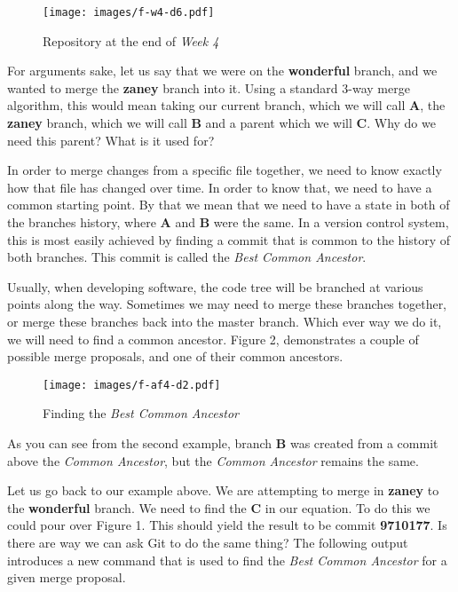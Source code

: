 \begin{figure}[hbt]
\centering
\texttt{[image: images/f-w4-d6.pdf]}
\caption{Repository at the end of \emph{Week 4}}
\end{figure}

For arguments sake, let us say that we were on the \textbf{wonderful} branch, and we wanted to merge the \textbf{zaney} branch into it.  Using a standard 3-way merge algorithm, this would mean taking our current branch, which we will call \textbf{A}, the \textbf{zaney} branch, which we will call \textbf{B} and a parent which we will \textbf{C}.  Why do we need this parent?  What is it used for?

In order to merge changes from a specific file together, we need to know exactly how that file has changed over time.  In order to know that, we need to have a common starting point.  By that we mean that we need to have a state in both of the branches history, where \textbf{A} and \textbf{B} were the same.  In a version control system, this is most easily achieved by finding a commit that is common to the history of both branches.  This commit is called the \emph{Best Common Ancestor}.

Usually, when developing software, the code tree will be branched at various points along the way.  Sometimes we may need to merge these branches together, or merge these branches back into the master branch.  Which ever way we do it, we will need to find a common ancestor.  Figure 2, demonstrates a couple of possible merge proposals, and one of their common ancestors.

\begin{figure}[hbt]
\centering
\texttt{[image: images/f-af4-d2.pdf]}
\caption{Finding the \emph{Best Common Ancestor}}
\end{figure}

As you can see from the second example, branch \textbf{B} was created from a commit above the \emph{Common Ancestor}, but the \emph{Common Ancestor} remains the same.  

Let us go back to our example above.  We are attempting to merge in \textbf{zaney} to the \textbf{wonderful} branch.  We need to find the \textbf{C} in our equation.  To do this we could pour over Figure 1.  This should yield the result to be commit \textbf{9710177}.  Is there are way we can ask Git to do the same thing?  The following output introduces a new command that is used to find the \emph{Best Common Ancestor} for a given merge proposal.

